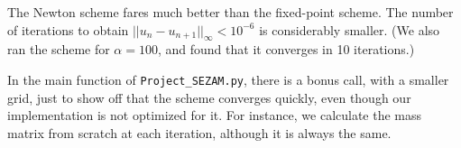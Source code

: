 \documentclass[11pt, a4paper, twoside]{article}
\begin{document}
The Newton scheme fares much better than the fixed-point scheme. The number of iterations to obtain $||u_n -u_{n+1}||_\infty < 10^{-6}$ is considerably smaller. (We also ran the scheme for $\alpha=100$, and found that it converges in 10 iterations.)

In the main function of \verb+Project_SEZAM.py+, there is a bonus call, with a smaller grid, just to show off that the scheme converges quickly, even though our implementation is not optimized for it. For instance, we calculate the mass matrix from scratch at each iteration, although it is always the same.

\end{document}
